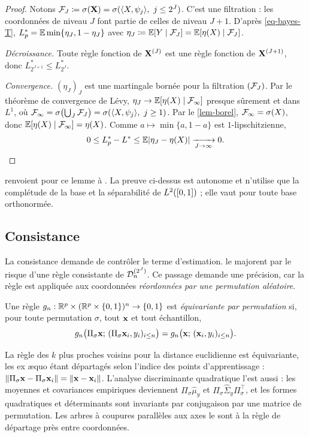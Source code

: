 \begin{proof}
Notons $\mathcal{F}_J\coloneqq\sigma(\mathbf{X})=\sigma(\langle X,\psi_j\rangle,\ j\le2^J)$. C'est une filtration : les coordonnées de niveau $J$ font partie de celles de niveau $J+1$. D'après \eqref{eq-bayes-T}, $L^*_p=\mathbb{E}\min\{\eta_J,1-\eta_J\}$ avec $\eta_J\coloneqq\mathbb{E}[Y\mid\mathcal{F}_J]=\mathbb{E}[\eta(X)\mid\mathcal{F}_J]$.

\emph{Décroissance.} Toute règle fonction de $\mathbf{X}^{(J)}$ est une règle fonction de $\mathbf{X}^{(J+1)}$, donc $L^*_{2^{J+1}}\le L^*_{2^J}$.

\emph{Convergence.} $(\eta_J)_J$ est une martingale bornée pour la filtration $(\mathcal{F}_J)$. Par le théorème de convergence de Lévy, $\eta_J\to\mathbb{E}[\eta(X)\mid\mathcal{F}_\infty]$ presque sûrement et dans $L^1$, où $\mathcal{F}_\infty=\sigma\bigl(\bigcup_J\mathcal{F}_J\bigr)=\sigma(\langle X,\psi_j\rangle,\ j\ge1)$. Par le \cref{lem-borel}, $\mathcal{F}_\infty=\sigma(X)$, donc $\mathbb{E}[\eta(X)\mid\mathcal{F}_\infty]=\eta(X)$. Comme $a\mapsto\min\{a,1-a\}$ est $1$-lipschitzienne,
\[
  0\le L^*_p-L^*\le\mathbb{E}|\eta_J-\eta(X)|\xrightarrow[J\to\infty]{}0. \qedhere
\]
\end{proof}

\begin{remarque}
\citet{berlinet2008functional} renvoient pour ce lemme à \citet[théorème 32.3]{devroye1996probabilistic}. La preuve ci-dessus est autonome et n'utilise que la complétude de la base et la séparabilité de $L^2([0,1])$ ; elle vaut pour toute base orthonormée.
\end{remarque}

\subsection{Consistance}

La consistance demande de contrôler le terme d'estimation. \citet{berlinet2008functional} le majorent par le risque d'une règle consistante de $\mathcal{D}_n^{(2^J)}$. Ce passage demande une précision, car la règle est appliquée aux coordonnées \emph{réordonnées par une permutation aléatoire}.

\begin{definition}\label{def-equivariance}
Une règle $g_n:\mathbb{R}^p\times(\mathbb{R}^p\times\{0,1\})^n\to\{0,1\}$ est \emph{équivariante par permutation} si, pour toute permutation $\sigma$, tout $\mathbf{x}$ et tout échantillon,
\[
  g_n\bigl(\Pi_\sigma\mathbf{x};\,(\Pi_\sigma\mathbf{x}_i,y_i)_{i\le n}\bigr)=g_n\bigl(\mathbf{x};\,(\mathbf{x}_i,y_i)_{i\le n}\bigr).
\]
\end{definition}

\begin{exemple}\label{ex-equivariance}
La règle des $k$ plus proches voisins pour la distance euclidienne est équivariante, les ex æquo étant départagés selon l'indice des points d'apprentissage : $\|\Pi_\sigma\mathbf{x}-\Pi_\sigma\mathbf{x}_i\|=\|\mathbf{x}-\mathbf{x}_i\|$. L'analyse discriminante quadratique l'est aussi : les moyennes et covariances empiriques deviennent $\Pi_\sigma\hat\mu_y$ et $\Pi_\sigma\hat\Sigma_y\Pi_\sigma^\top$, et les formes quadratiques et déterminants sont invariants par conjugaison par une matrice de permutation. Les arbres à coupures parallèles aux axes le sont à la règle de départage près entre coordonnées.
\end{exemple}

